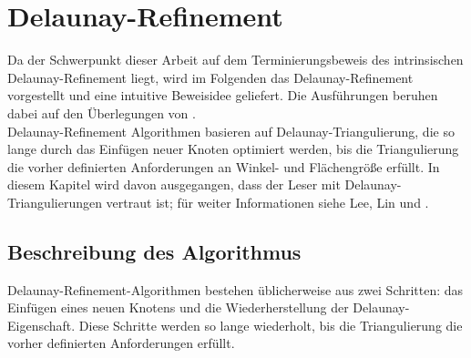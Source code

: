 \chapter{ Delaunay-Refinement }\label{kap:Algorithmus} Da der Schwerpunkt dieser Arbeit auf dem Terminierungsbeweis des intrinsischen Delaunay-Refinement liegt, wird im Folgenden das Delaunay-Refinement vorgestellt und eine intuitive Beweisidee geliefert. Die Ausführungen beruhen dabei auf den Überlegungen von \citet{shewchuk:1997:delaunay,SHEWCHUK:2002:chuws}.\\
Delaunay-Refinement Algorithmen basieren auf Delaunay-Triangulierung, die so lange durch das Einfügen neuer Knoten optimiert werden, bis die Triangulierung die vorher definierten Anforderungen an Winkel- und Flächengröße erfüllt. In diesem Kapitel wird davon ausgegangen, dass der Leser mit Delaunay-Triangulierungen vertraut ist; für weiter Informationen siehe Lee, Lin \cite{lee:1986:DelaunayTriangulation} und \citet{chew:1993:guaranteed}. 


\section*{Beschreibung des Algorithmus}

Delaunay-Refinement-Algorithmen bestehen üblicherweise aus zwei Schritten: das Einfügen eines neuen Knotens und die Wiederherstellung der Delaunay-Eigenschaft.
Diese Schritte  werden so lange wiederholt, bis die Triangulierung die vorher definierten Anforderungen erfüllt.\\ 
  
